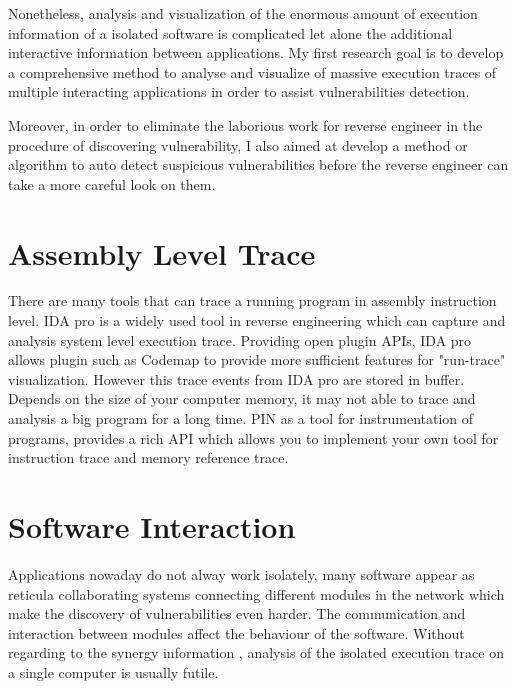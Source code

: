 Nonetheless, analysis and visualization of the enormous amount of execution information of a isolated software is complicated let alone the additional interactive information between applications. My first research goal is to develop a comprehensive method to analyse and visualize of massive execution traces of multiple interacting applications in order to  assist vulnerabilities detection. 

Moreover, in order to eliminate the laborious work for reverse engineer in the procedure of discovering vulnerability, I also aimed at develop a method or algorithm to auto detect suspicious vulnerabilities before the reverse engineer can take a more careful look on them.

\section{Assembly Level Trace}
There are many tools that can trace a running program in assembly instruction level.  IDA pro \cite{eagle_ida_2008} is a widely used tool in reverse engineering which can capture and analysis system level execution trace. Providing open plugin APIs, IDA pro allows plugin such as Codemap \cite{_c0demap/codemap:_????} to provide more sufficient features for "run-trace" visualization. However this trace events from IDA pro are stored in buffer. Depends on the size of your computer memory, it may not able to trace and analysis a big program for a long time. PIN\cite{_pin_????} as a tool for instrumentation of programs, provides a rich API which allows you to implement your own tool for instruction trace and memory reference trace. 
\section{Software Interaction}
Applications nowaday do not alway work isolately,  many software  appear as  reticula collaborating systems connecting different modules in the network\cite{PhysRevE.68.046116} which make the discovery of vulnerabilities even harder. The communication and interaction between modules affect the behaviour of the software. Without regarding to the synergy information , analysis of the isolated execution trace on a single computer is usually futile. 


